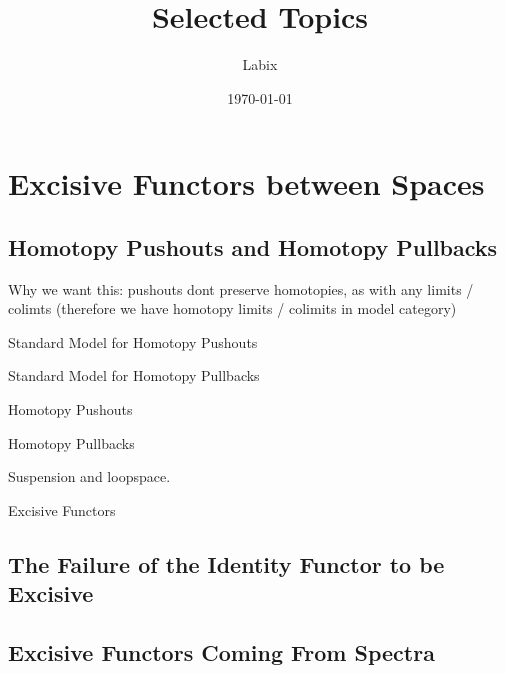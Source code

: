 \documentclass[a4paper]{article}
\title{Selected Topics}
\author{Labix}
\date{\today}
\begin{document}
\maketitle
\begin{abstract}
\end{abstract}

\pagebreak
\tableofcontents

\pagebreak
\section{Excisive Functors between Spaces}
\subsection{Homotopy Pushouts and Homotopy Pullbacks}
Why we want this: pushouts dont preserve homotopies, as with any limits / colimts (therefore we have homotopy limits / colimits in model category)

\begin{defn}{Standard Model for Homotopy Pushouts}{}
\end{defn}

\begin{defn}{Standard Model for Homotopy Pullbacks}{}
\end{defn}

\begin{defn}{Homotopy Pushouts}{}
\end{defn}

\begin{defn}{Homotopy Pullbacks}{}
\end{defn}

\begin{eg}{}{} Suspension and loopspace. 
\end{eg}

\begin{prp}{}{}
\end{prp}

\begin{defn}{Excisive Functors}{}
\end{defn}

\subsection{The Failure of the Identity Functor to be Excisive}

\subsection{Excisive Functors Coming From Spectra}
\end{document}
